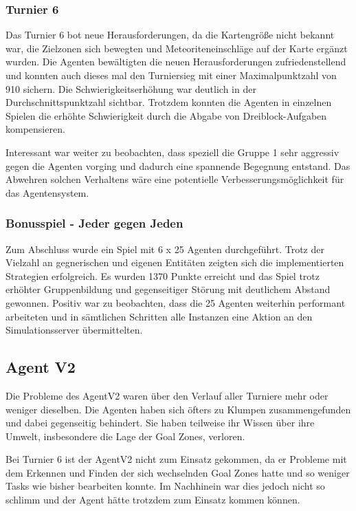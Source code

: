 \documentclass[runningheads]{llncs}
\begin{document}
\subsubsection{Turnier 6}
Das Turnier 6 bot neue Herausforderungen, da die Kartengröße nicht bekannt war, die Zielzonen sich bewegten und Meteoriteneinschläge auf der Karte ergänzt wurden. Die Agenten bewältigten die neuen Herausforderungen zufriedenstellend und konnten auch dieses mal den Turniersieg mit einer Maximalpunktzahl von 910 sichern. Die Schwierigkeitserhöhung war deutlich in der Durchschnittspunktzahl sichtbar. Trotzdem konnten die Agenten in einzelnen Spielen die erhöhte Schwierigkeit durch die Abgabe von Dreiblock-Aufgaben kompensieren.

Interessant war weiter zu beobachten, dass speziell die Gruppe 1 sehr aggressiv gegen die Agenten vorging und dadurch eine spannende Begegnung entstand. Das Abwehren solchen Verhaltens wäre eine potentielle Verbesserungsmöglichkeit für das Agentensystem. 

\subsubsection{Bonusspiel - Jeder gegen Jeden}
Zum Abschluss wurde ein Spiel mit 6 x 25 Agenten durchgeführt. Trotz der Vielzahl an gegnerischen und eigenen Entitäten zeigten sich die implementierten Strategien erfolgreich. Es wurden 1370 Punkte erreicht und das Spiel trotz erhöhter Gruppenbildung und gegenseitiger Störung mit deutlichem Abstand gewonnen.
Positiv war zu beobachten, dass die 25 Agenten weiterhin performant arbeiteten und in sämtlichen Schritten alle Instanzen eine Aktion an den Simulationsserver übermittelten.  





\subsection{Agent V2}
Die Probleme des AgentV2 waren über den Verlauf aller Turniere mehr oder weniger dieselben.  Die Agenten haben sich öfters zu Klumpen zusammengefunden und dabei gegenseitig behindert. Sie haben teilweise ihr Wissen über ihre Umwelt, insbesondere die Lage der Goal Zones, verloren. 

Bei Turnier 6 ist der AgentV2 nicht zum Einsatz gekommen, da er Probleme mit dem Erkennen und Finden der sich wechselnden Goal Zones hatte und so weniger Tasks wie bisher bearbeiten konnte. Im Nachhinein war dies jedoch nicht so schlimm und der Agent hätte trotzdem zum Einsatz kommen können. 
\end{document}
